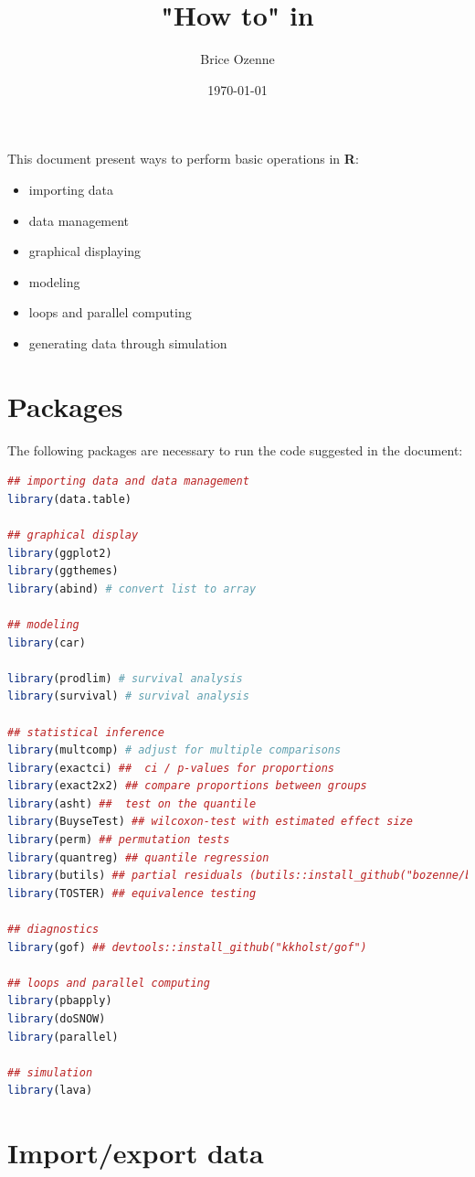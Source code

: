 \documentclass{article}
\author{Brice Ozenne}
\date{\today}
\title{"How to" in \Rlogo}
\newcommand\Rlogo{\textbf{\textsf{R}}\xspace}
\begin{document}
\maketitle
This document present ways to perform basic operations in \Rlogo:
\begin{itemize}
\item importing data
\item data management
\item graphical displaying
\item modeling
\item loops and parallel computing
\item generating data through simulation
\end{itemize}

\clearpage

\tableofcontents

\clearpage
\section{Packages}
\label{sec:org67c4186}
The following packages are necessary to run the code suggested in the document:
\begin{lstlisting}[language=r,numbers=none]
## importing data and data management
library(data.table)

## graphical display
library(ggplot2)
library(ggthemes)
library(abind) # convert list to array

## modeling
library(car)

library(prodlim) # survival analysis
library(survival) # survival analysis

## statistical inference
library(multcomp) # adjust for multiple comparisons
library(exactci) ##  ci / p-values for proportions 
library(exact2x2) ## compare proportions between groups
library(asht) ##  test on the quantile
library(BuyseTest) ## wilcoxon-test with estimated effect size
library(perm) ## permutation tests
library(quantreg) ## quantile regression
library(butils) ## partial residuals (butils::install_github("bozenne/butils"))
library(TOSTER) ## equivalence testing

## diagnostics 
library(gof) ## devtools::install_github("kkholst/gof")

## loops and parallel computing
library(pbapply)
library(doSNOW)
library(parallel)

## simulation
library(lava)
\end{lstlisting}

\clearpage
\section{Import/export data}
\label{sec:orgd4330c2}
\end{document}
